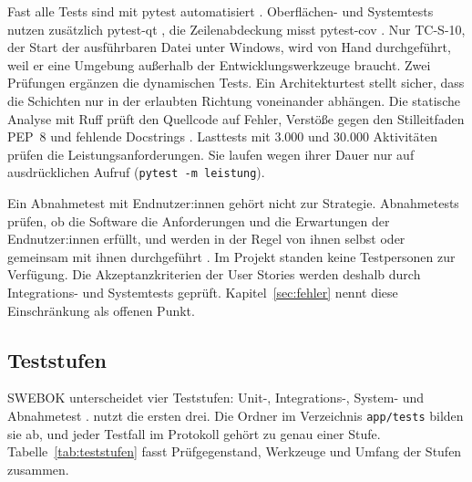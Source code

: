 Fast alle Tests sind mit pytest automatisiert \parencite{pytest}. Oberflächen- und Systemtests nutzen zusätzlich pytest-qt \parencite{pytestqt}, die Zeilenabdeckung misst pytest-cov \parencite{pytestcov}. Nur TC-S-10, der Start der ausführbaren Datei unter Windows, wird von Hand durchgeführt, weil er eine Umgebung außerhalb der Entwicklungswerkzeuge braucht. Zwei Prüfungen ergänzen die dynamischen Tests. Ein Architekturtest stellt sicher, dass die Schichten nur in der erlaubten Richtung voneinander abhängen. Die statische Analyse mit Ruff prüft den Quellcode auf Fehler, Verstöße gegen den Stilleitfaden \acs{PEP}~8 und fehlende Docstrings \parencite{ruff}. Lasttests mit 3.000 und 30.000 Aktivitäten prüfen die Leistungsanforderungen. Sie laufen wegen ihrer Dauer nur auf ausdrücklichen Aufruf (\texttt{pytest -m leistung}).

Ein Abnahmetest mit Endnutzer:innen gehört nicht zur Strategie. Abnahmetests prüfen, ob die Software die Anforderungen und die Erwartungen der Endnutzer:innen erfüllt, und werden in der Regel von ihnen selbst oder gemeinsam mit ihnen durchgeführt \parencite[S.~5-7]{swebok2026}. Im Projekt standen keine Testpersonen zur Verfügung. Die Akzeptanzkriterien der User Stories werden deshalb durch Integrations- und Systemtests geprüft. Kapitel~\ref{sec:fehler} nennt diese Einschränkung als offenen Punkt.

\subsection{Teststufen}\label{sec:teststufen}
SWEBOK unterscheidet vier Teststufen: Unit-, Integrations-, System- und Abnahmetest \parencite[S.~5-6]{swebok2026}. \Projektname{} nutzt die ersten drei. Die Ordner im Verzeichnis \texttt{app/tests} bilden sie ab, und jeder Testfall im Protokoll gehört zu genau einer Stufe. Tabelle~\ref{tab:teststufen} fasst Prüfgegenstand, Werkzeuge und Umfang der Stufen zusammen.

